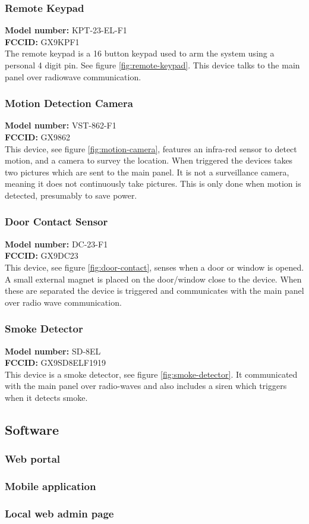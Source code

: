 \subsubsection{Remote Keypad}
\textbf{Model number:} KPT-23-EL-F1 \\ %
\textbf{FCCID:} GX9KPF1 \\ %
The remote keypad is a 16 button keypad used to arm the system using a personal 4 digit pin. See figure \ref{fig:remote-keypad}. This device talks to the main panel over radiowave communication.

\subsubsection{Motion Detection Camera}
\textbf{Model number:} VST-862-F1 \\
\textbf{FCCID:} GX9862 \\
This device, see figure \ref{fig:motion-camera}, features an infra-red sensor to detect motion, and a camera to survey the location. When triggered the devices takes two pictures which are sent to the main panel. It is not a surveillance camera, meaning it does not continuously take pictures. This is only done when motion is detected, presumably to save power.

\subsubsection{Door Contact Sensor}
\textbf{Model number:} DC-23-F1 \\
\textbf{FCCID:} GX9DC23 \\
This device, see figure \ref{fig:door-contact}, senses when a door or window is opened. A small external magnet is placed on the door/window close to the device. When these are separated the device is triggered and communicates with the main panel over radio wave communication.

\subsubsection{Smoke Detector}
\textbf{Model number:} SD-8EL \\
\textbf{FCCID:} GX9SD8ELF1919 \\
This device is a smoke detector, see figure \ref{fig:smoke-detector}. It communicated with the main panel over radio-waves and also includes a siren which triggers when it detects smoke.

\subsection{Software} \label{ch:system:software}
\subsubsection{Web portal}

\subsubsection{Mobile application}

\subsubsection{Local web admin page}